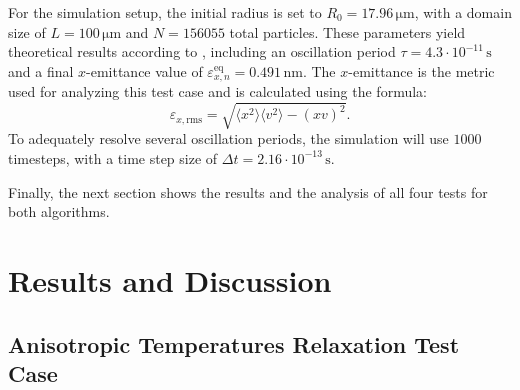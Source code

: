 \begin{description}
    For the simulation setup, the initial radius is set to $R_0 = 17.96\,\si{\micro\metre}$, with a domain size of $L = 100\,\si{\micro\metre}$ and $N = 156055$ total particles. These parameters yield theoretical results according to \cite[595]{Mitchell2015}, including an oscillation period $\tau = 4.3 \cdot 10^{-11}\,\si{\second}$ and a final $x$-emittance value of $\varepsilon_{x,n}^\mathrm{eq} = 0.491 \,\si{\nano\metre}$. The $x$-emittance is the metric used for analyzing this test case and is calculated using the formula:
    $$
    \varepsilon_{x, \mathrm{rms}} = \sqrt{\langle x^2 \rangle \langle v^2 \rangle - (xv)^2}.
    $$
    To adequately resolve several oscillation periods, the simulation will use $1000$ timesteps, with a time step size of $\Delta t = 2.16\cdot 10^{-13}\,\si{\second}$.
\end{description}
Finally, the next section shows the results and the analysis of all four tests for both algorithms. 


\section{Results and Discussion}

\subsection{Anisotropic Temperatures Relaxation Test Case}\label{sec:result:trubnikov}

